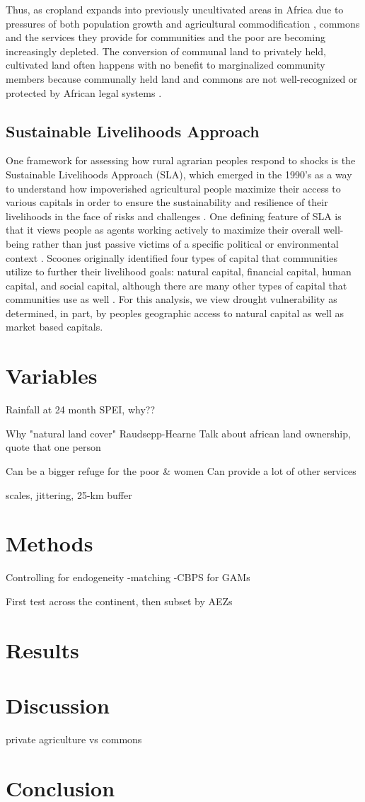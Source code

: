 \documentclass{article}
\begin{document}
Thus, as cropland expands into previously uncultivated areas in Africa due to pressures of both population growth and agricultural commodification \cite{Rudel2013, Laurance2014}, commons and the services they provide for communities and the poor are becoming increasingly depleted.  The conversion of communal land to privately held, cultivated land often happens with no benefit to marginalized community members because communally held land and commons are not well-recognized or protected by African legal systems \cite{Wily2011}.

\subsection{Sustainable Livelihoods Approach}
One framework for assessing how rural agrarian peoples respond to shocks is the Sustainable Livelihoods Approach (SLA), which emerged in the 1990’s as a way to understand how impoverished agricultural people maximize their access to various capitals in order to ensure the sustainability and resilience of their livelihoods in the face of risks and challenges \cite{Scoones1998a, Ellis1998, Bebbington1999}.  One defining feature of SLA is that it views people as agents working actively to maximize their overall well-being rather than just passive victims of a specific political or environmental context \cite{Adato2002}.  Scoones originally identified four types of capital that communities utilize to further their livelihood goals: natural capital, financial capital, human capital, and social capital, although there are many other types of capital that communities use as well \cite{Scoones1998a}.  For this analysis, we view drought vulnerability as determined, in part, by peoples geographic access to natural capital as well as market based capitals.

\section{Variables}

Rainfall at 24 month SPEI, why??

Why "natural land cover"
	Raudsepp-Hearne
	Talk about african land ownership, quote that one person
	
	Can be a bigger refuge for the poor \& women
	Can provide a lot of other services
	
	scales, jittering, 25-km buffer
	

\section{Methods}
Controlling for endogeneity
	-matching
	-CBPS for GAMs

First test across the continent, then subset by AEZs

\section{Results}


\section{Discussion}

private agriculture vs commons

\section{Conclusion}




\end{document}
